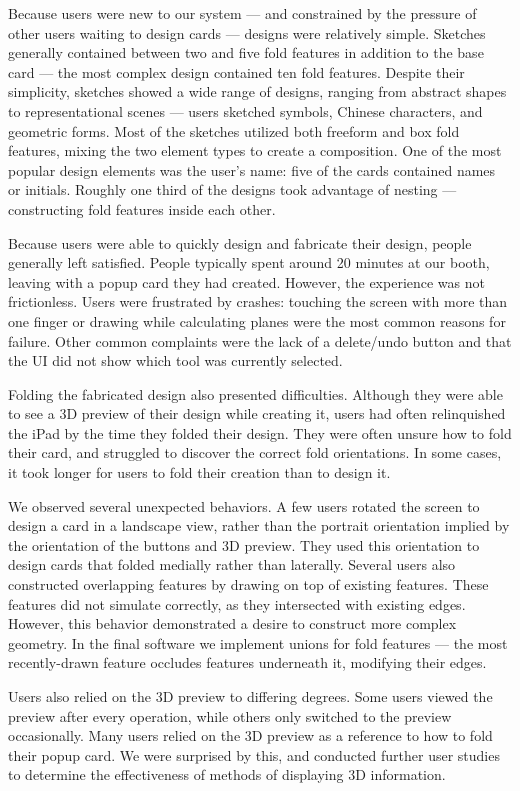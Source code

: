 Because users were new to our system --- and constrained by the pressure
of other users waiting to design cards --- designs were relatively
simple. Sketches generally contained between two and five fold features
in addition to the base card --- the most complex design contained ten
fold features. Despite their simplicity, sketches showed a wide range of
designs, ranging from abstract shapes to representational scenes ---
users sketched symbols, Chinese characters, and geometric forms. Most of
the sketches utilized both freeform and box fold features, mixing the
two element types to create a composition. One of the most popular
design elements was the user's name: five of the cards contained names
or initials. Roughly one third of the designs took advantage of nesting
--- constructing fold features inside each other.

Because users were able to quickly design and fabricate their design,
people generally left satisfied. People typically spent around 20
minutes at our booth, leaving with a popup card they had created.
However, the experience was not frictionless. Users were frustrated by
crashes: touching the screen with more than one finger or drawing while
calculating planes were the most common reasons for failure. Other
common complaints were the lack of a delete/undo button and that the UI
did not show which tool was currently selected.

Folding the fabricated design also presented difficulties. Although they
were able to see a 3D preview of their design while creating it, users
had often relinquished the iPad by the time they folded their design.
They were often unsure how to fold their card, and struggled to discover
the correct fold orientations. In some cases, it took longer for users
to fold their creation than to design it.

We observed several unexpected behaviors. A few users rotated the screen
to design a card in a landscape view, rather than the portrait
orientation implied by the orientation of the buttons and 3D preview.
They used this orientation to design cards that folded medially rather
than laterally. Several users also constructed overlapping features by
drawing on top of existing features. These features did not simulate
correctly, as they intersected with existing edges. However, this
behavior demonstrated a desire to construct more complex geometry. In
the final software we implement unions for fold features --- the most
recently-drawn feature occludes features underneath it, modifying their
edges.

Users also relied on the 3D preview to differing degrees. Some users
viewed the preview after every operation, while others only switched to
the preview occasionally. Many users relied on the 3D preview as a
reference to how to fold their popup card. We were surprised by this,
and conducted further user studies to determine the effectiveness of
methods of displaying 3D information.
